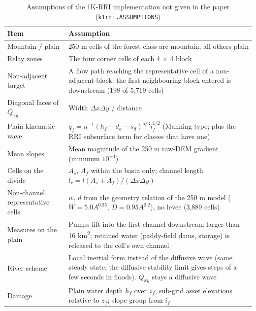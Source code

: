 \documentclass[a4paper,10pt]{ltjsarticle}
\begin{document}
\begin{table}[tbp]
\centering\footnotesize\setlength{\tabcolsep}{3pt}
\caption{Assumptions of the 1K-RRI implementation not given in the paper\cite{sugawara2024} (\texttt{k1rri.ASSUMPTIONS})}
\label{tab:k1assume}
\begin{tabularx}{\textwidth}{@{}>{\raggedright\arraybackslash}p{36mm} L@{}}
\toprule
Item & Assumption \\
\midrule
Mountain / plain & 250 m cells of the forest class are mountain, all others plain \\
Relay zones & The four corner cells of each 4 × 4 block \\
Non-adjacent target & A flow path reaching the representative cell of a non-adjacent block: the first neighbouring block entered is downstream (198 of 5,719 cells) \\
Diagonal faces of $Q_{xy}$ & Width $\Delta x\Delta y$ / distance \\
Plain kinematic wave & $q_f=n^{-1}(h_f-d_a-s_d)^{5/3}i_f^{1/2}$ (Manning type; plus the RRI subsurface term for classes that have one) \\
Mean slopes & Mean magnitude of the 250 m raw-DEM gradient (minimum $10^{-4}$) \\
Cells on the divide & $A_s$, $A_f$ within the basin only; channel length $l_r=l(A_s+A_f)/(\Delta x\Delta y)$ \\
Non-channel representative cells & $w$, $d$ from the geometry relation of the 250 m model ($W=5.0A^{0.35}$, $D=0.95A^{0.2}$), no levee (3,889 cells) \\
Measures on the plain & Pumps lift into the first channel downstream larger than 16 km\textsuperscript{2}; retained water (paddy-field dams, storage) is released to the cell's own channel \\
River scheme & Local inertial form\cite{bates2010} instead of the diffusive wave (same steady state; the diffusive stability limit gives steps of a few seconds in floods). $Q_{xy}$ stays a diffusive wave \\
Damage & Plain water depth $h_f$ over $z_f$; sub-grid asset elevations relative to $z_f$; slope group from $i_f$ \\
\bottomrule
\end{tabularx}
\end{table}
\end{document}
